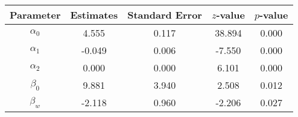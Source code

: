 \begin{table}[ht]
\centering
\begin{tabular}{ccccc}
  \hline
Parameter & Estimates & Standard Error & $z$-value & $p$-value \\ 
  \hline
$\alpha_0$ & 4.555 & 0.117 & 38.894 & 0.000 \\ 
  $\alpha_1$ & -0.049 & 0.006 & -7.550 & 0.000 \\ 
  $\alpha_2$ & 0.000 & 0.000 & 6.101 & 0.000 \\ 
  $\beta_0$ & 9.881 & 3.940 & 2.508 & 0.012 \\ 
  $\beta_w$ & -2.118 & 0.960 & -2.206 & 0.027 \\ 
   \hline
\end{tabular}
\end{table}
